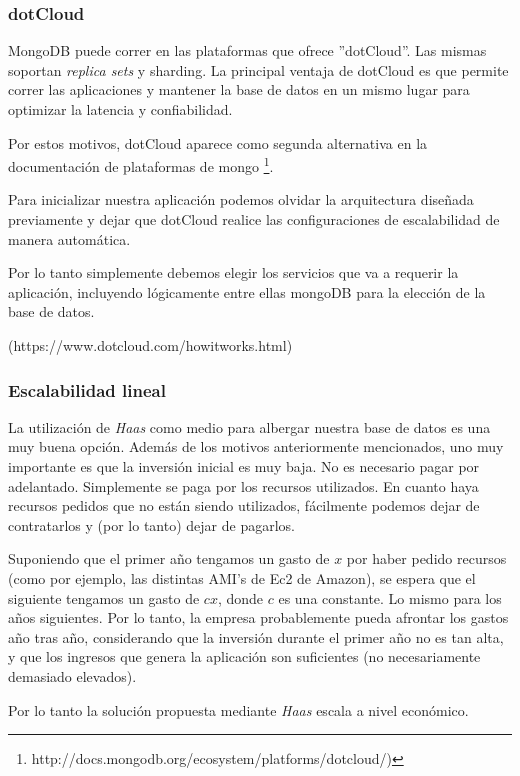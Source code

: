 \subsubsection{dotCloud}

MongoDB puede correr en las plataformas que ofrece ''dotCloud''. Las mismas soportan \emph{replica sets} y sharding.
La principal ventaja de dotCloud es que permite correr las aplicaciones y mantener la base de datos en un mismo lugar
para optimizar la latencia y confiabilidad.

Por estos motivos, dotCloud aparece como segunda alternativa en la documentación de plataformas de mongo
\footnote{http://docs.mongodb.org/ecosystem/platforms/dotcloud/)}.

Para inicializar nuestra aplicación podemos olvidar la arquitectura diseñada previamente y dejar que dotCloud realice
las configuraciones de escalabilidad de manera automática. 

Por lo tanto simplemente debemos elegir los servicios que va a requerir la aplicación, incluyendo 
lógicamente entre ellas mongoDB para la elección de la base de datos.

(https://www.dotcloud.com/howitworks.html)


\subsubsection{Escalabilidad lineal}

La utilización de \emph{Haas} como medio para albergar nuestra base de datos es una muy buena opción. Además de los motivos
anteriormente mencionados, uno muy importante es que la inversión inicial es muy baja. No es necesario pagar por adelantado.
Simplemente se paga por los recursos  utilizados. En cuanto haya recursos pedidos que no están siendo utilizados, fácilmente
podemos dejar de contratarlos y (por lo tanto) dejar de pagarlos.

Suponiendo que el primer a\~no tengamos un gasto de $x$ por haber pedido recursos (como por ejemplo, las distintas AMI's de
Ec2 de Amazon), se espera que el siguiente tengamos un gasto de $cx$, donde $c$ es una constante. Lo mismo para los a\~nos
siguientes. Por lo tanto, la empresa probablemente pueda afrontar los gastos a\~no tras a\~no, considerando que 
la inversión durante el primer a\~no no es tan alta, y que los ingresos que genera la aplicaci\'on son suficientes (no
necesariamente demasiado elevados).

Por lo tanto la solución propuesta mediante \emph{Haas} escala a nivel económico.

